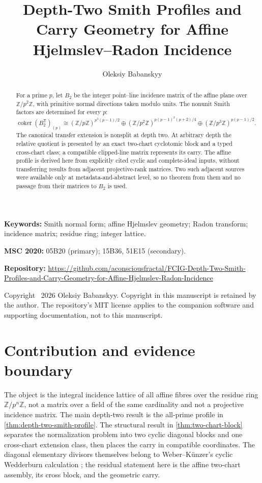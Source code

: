 \documentclass[12pt,a4paper]{article}
\title{Depth-Two Smith Profiles and Carry Geometry for Affine
  Hjelmslev--Radon Incidence}
\author{Oleksiy Babanskyy}
\date{}
\theoremstyle{definition}
\newcommand{\Z}{\mathbb Z}
\newcommand{\coker}{\operatorname{coker}}
\newcommand{\transpose}{\mathsf T}
\begin{document}
\raggedbottom
\maketitle

\begin{abstract}
For a prime $p$, let $B_2$ be the integer point--line incidence matrix of
the affine plane over $\Z/p^2\Z$, with primitive normal directions taken
modulo units.  The nonunit Smith factors are determined for every $p$:
\[
 \coker(B_2^{\transpose})_{(p)}\cong
 (\Z/p\Z)^{p^3(p-1)/2}\oplus
 (\Z/p^2\Z)^{p(p-1)^2(p+2)/4}\oplus
 (\Z/p^3\Z)^{p(p-1)/2}.
\]
The canonical transfer extension is nonsplit at depth two.  At arbitrary
depth the relative quotient is presented by an exact two-chart cyclotomic
block and a typed cross-chart class; a compatible clipped-line matrix
represents its carry.  The affine profile is derived here from explicitly
cited cyclic and complete-ideal inputs, without transferring results from
adjacent projective-rank matrices.  Two such adjacent sources were available
only at metadata-and-abstract level, so no theorem from them and no passage
from their matrices to $B_2$ is used.
\end{abstract}

\smallskip
\noindent\textbf{Keywords:} Smith normal form; affine Hjelmslev geometry;
Radon transform; incidence matrix; residue ring; integer lattice.

\smallskip
\noindent\textbf{MSC 2020:} 05B20 (primary); 15B36, 51E15 (secondary).

\smallskip
\noindent\textbf{Repository:}
\url{https://github.com/aconsciousfractal/FCIG-Depth-Two-Smith-Profiles-and-Carry-Geometry-for-Affine-Hjelmslev-Radon-Incidence}

\smallskip
\noindent\footnotesize Copyright \textcopyright\ 2026 Oleksiy Babanskyy.
Copyright in this manuscript is retained by the author.  The repository's
MIT license applies to the companion software and supporting documentation,
not to this manuscript.
\normalsize

\section{Contribution and evidence boundary}\label{sec:S00}

The object is the integral incidence lattice of all affine fibres over the
residue ring $\Z/p^n\Z$, not a matrix over a field of the same cardinality
and not a projective incidence matrix.  The main depth-two result is the
all-prime profile in \cref{thm:depth-two-smith-profile}.  The structural result in
\cref{thm:two-chart-block} separates the normalization problem into two cyclic
diagonal blocks and one cross-chart extension class, then places the carry
in compatible coordinates.  The diagonal elementary divisors themselves
belong to Weber--K\"unzer's cyclic Wedderburn calculation
\cite[Propositions~3.8 and~3.15]{WK04}; the residual statement here is the
affine two-chart assembly, its cross block, and the geometric carry.
\end{document}
